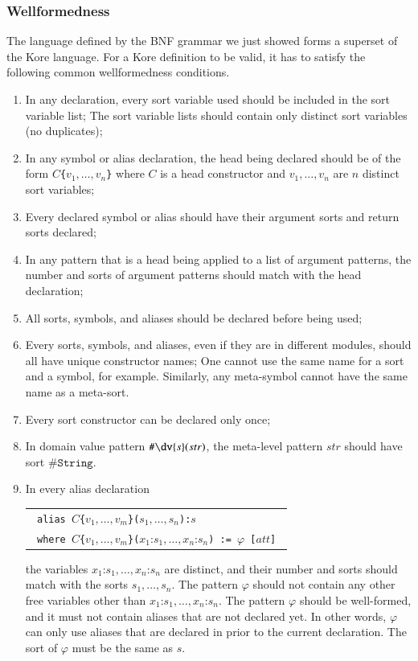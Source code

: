 \documentclass[UTF8,11pt]{article}
\theoremstyle{plain}
\theoremstyle{definition}
\theoremstyle{remark}
\newcommand{\cln}{\texttt{:}}
\newcommand{\sharpsymbol}{\#}
\newcommand{\KString}{\texttt{\sharpsymbol String}}
\newcommand{\Kdv}{\texttt{\sharpsymbol \slashsymbol dv}}
\newcommand{\slashsymbol}{\symbol{92}}
\begin{document}
\subsubsection{Wellformedness}
\label{sec:kore-syntax-wellformedness}
The language defined by the BNF grammar we just showed forms a superset of the
Kore language.
For a Kore definition to be valid, it has to satisfy the following common
wellformedness conditions.
\begin{enumerate}\itemsep0em
\item In any declaration, every sort variable used should be included in the
sort variable list; The sort variable lists should contain only distinct sort
variables (no duplicates);
\item In any symbol or alias declaration, the head being declared should be of
the form \texttt{$C$\{$v_1,\dots,v_n$\}} where $C$ is a head constructor and
$v_1,\dots,v_n$ are $n$ distinct sort variables;
\item Every declared symbol or alias should have their argument sorts and
return sorts declared;
\item In any pattern that is a head being applied to a list of argument
patterns, the number and sorts of argument patterns should match with the head
declaration;
\item All sorts, symbols, and aliases should be declared before being used;
\item Every sorts, symbols, and aliases, even if they are in different modules,
should all have unique constructor
names; One cannot use the same name for a sort and a symbol, for example.
Similarly, any meta-symbol cannot have the same name as a meta-sort.
\item Every sort constructor can be declared only once;
\item In domain value pattern $\Kdv\{s\}(str)$, the meta-level pattern $str$
should have sort $\KString$.
\item In every alias declaration
      \begin{center}
      \begin{tabular}{l}
      \texttt{
      alias $C$\{$v_1,\dots,v_m$\}($s_1,\dots,s_n$):$s$
      }\\
      \texttt{
      where $C$\{$v_1,\dots,v_m$\}($x_1 \cln s_1,\dots,x_n \cln s_n$)
      := $\varphi$ [$att$]
      }
      \end{tabular}
      \end{center}
      the variables $x_1 \cln s_1,\dots,x_n \cln s_n$ are distinct, and
      their number and sorts should match with the sorts
      $s_1 ,\dots, s_n$.
      The pattern $\varphi$ should  not contain any other free variables
      other than $x_1 \cln s_1,\dots,x_n \cln s_n$.
      The pattern $\varphi$ should be well-formed, and it must not
      contain aliases that are not declared yet.
      In other words, $\varphi$ can only use aliases that are declared
      in prior to the current declaration.
      The sort of $\varphi$ must be the same as $s$.
\end{enumerate}
\end{document}
